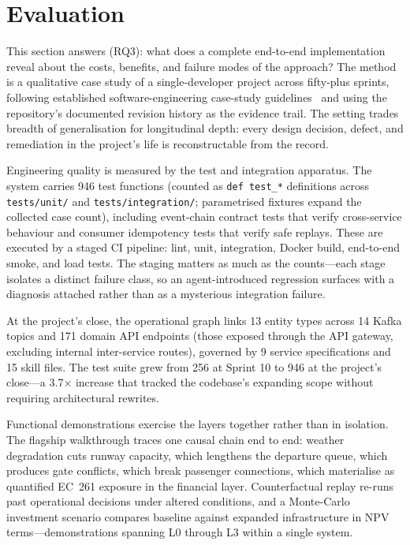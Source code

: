 \documentclass[runningheads]{llncs}
\begin{document}
\section{Evaluation}\label{sec:evaluation}

This section answers (RQ3): what does a complete end-to-end implementation reveal about the costs, benefits, and failure modes of the approach? The method is a qualitative case study of a single-developer project across fifty-plus sprints, following established software-engineering case-study guidelines~\cite{runeson2009} and using the repository's documented revision history as the evidence trail. The setting trades breadth of generalisation for longitudinal depth: every design decision, defect, and remediation in the project's life is reconstructable from the record.

Engineering quality is measured by the test and integration apparatus. The system carries 946 test functions (counted as \texttt{def test\_*} definitions across \texttt{tests/unit/} and \texttt{tests/integration/}; parametrised fixtures expand the collected case count), including event-chain contract tests that verify cross-service behaviour and consumer idempotency tests that verify safe replays. These are executed by a staged CI pipeline: lint, unit, integration, Docker build, end-to-end smoke, and load tests. The staging matters as much as the counts---each stage isolates a distinct failure class, so an agent-introduced regression surfaces with a diagnosis attached rather than as a mysterious integration failure.

At the project's close, the operational graph links 13 entity types across 14 Kafka topics and 171 domain API endpoints (those exposed through the API gateway, excluding internal inter-service routes), governed by 9 service specifications and 15 skill files. The test suite grew from 256 at Sprint 10 to 946 at the project's close---a 3.7× increase that tracked the codebase's expanding scope without requiring architectural rewrites.

Functional demonstrations exercise the layers together rather than in isolation. The flagship walkthrough traces one causal chain end to end: weather degradation cuts runway capacity, which lengthens the departure queue, which produces gate conflicts, which break passenger connections, which materialise as quantified EC~261 exposure in the financial layer. Counterfactual replay re-runs past operational decisions under altered conditions, and a Monte-Carlo investment scenario compares baseline against expanded infrastructure in NPV terms---demonstrations spanning L0 through L3 within a single system.
\end{document}
